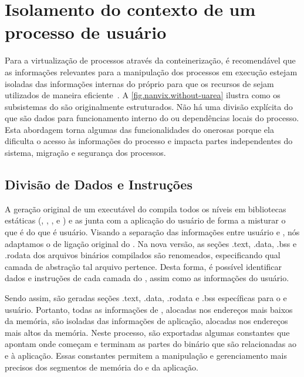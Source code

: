 \section{Isolamento do contexto de um processo de usuário}
\label{sec.dev.kernel-usuario}

Para a virtualização de processos através da conteinerização, é recomendável que as informações relevantes para a manipulação dos processos em execução estejam isoladas das informações internas do próprio \os para que os recursos de \hardware sejam utilizados de maneira eficiente~\cite{live-vm-migration-techniques}.
A \autoref{fig.nanvix.without-uarea} ilustra como os subsistemas do \nanvix são originalmente estruturados. Não há uma divisão explícita do que são dados para funcionamento interno do \os ou dependências locais do processo.
Esta abordagem torna algumas das funcionalidades do \os onerosas porque ela dificulta o acesso às informações do processo e impacta partes independentes do sistema, \eg migração e segurança dos processos.

\subsection{Divisão de Dados e Instruções}
\label{sec.divisao-dados-instrucao}

    A geração original de um executável do \nanvix compila todos os níveis em bibliotecas estáticas (\hal, \microkernel, \libnanvix, \ulibc e \multikernel) e as junta com a aplicação do usuário de forma a misturar o que é  do que é usuário.
    Visando a separação das informações entre usuário e , nós adaptamos o \script de ligação original do \nanvix. Na nova versão, as seções .text, .data, .bss e .rodata dos arquivos binários compilados são renomeados, especificando qual camada de abstração tal arquivo pertence. Desta forma, é possível identificar dados e instruções de cada camada do \nanvix, assim como as informações do usuário. 
    
    Sendo assim, são geradas seções .text, .data, .rodata e .bss específicas para o  e usuário. Portanto, todas as informações de , alocadas nos endereços mais baixos da memória, são isoladas das informações de aplicação, alocadas nos endereços mais altos da memória. Neste processo, são exportadas algumas constantes que apontam onde começam e terminam as partes do binário que são relacionadas ao  e à aplicação. Essas constantes permitem a manipulação e gerenciamento mais precisos dos segmentos de memória do  e da aplicação.
    
